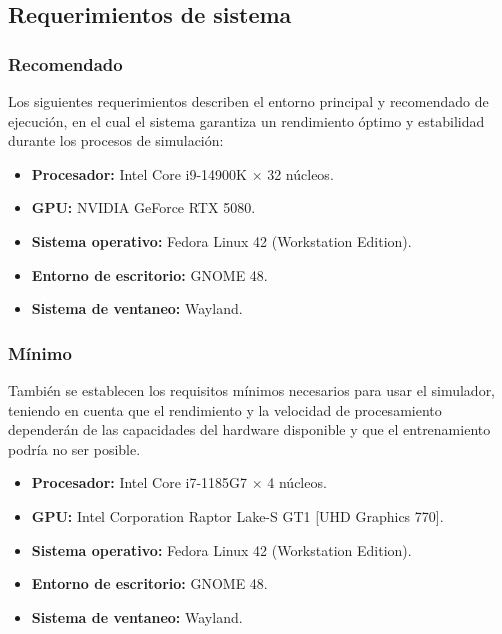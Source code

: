 \subsection{Requerimientos de sistema}

\subsubsection{Recomendado}

Los siguientes requerimientos describen el entorno principal y recomendado de ejecución, en el cual el sistema garantiza un rendimiento óptimo y estabilidad durante los procesos de simulación:

\begin{itemize}
	
	\item \textbf{Procesador:} Intel Core i9-14900K × 32 núcleos.
	
	\item \textbf{GPU:} NVIDIA GeForce RTX 5080.
	
	\item \textbf{Sistema operativo:} Fedora Linux 42 (Workstation Edition).
	
	\item \textbf{Entorno de escritorio:} GNOME 48.
	
	\item \textbf{Sistema de ventaneo:} Wayland.
	
\end{itemize}

\subsubsection{Mínimo}

También se establecen los requisitos mínimos necesarios para usar el simulador, teniendo en cuenta que el rendimiento y la velocidad de procesamiento dependerán de las capacidades del hardware disponible y que el entrenamiento podría no ser posible.

\begin{itemize}
	
	\item \textbf{Procesador:} Intel Core i7-1185G7 × 4 núcleos.
	
	\item \textbf{GPU:} Intel Corporation Raptor Lake-S GT1 [UHD Graphics 770].
	
	\item \textbf{Sistema operativo:} Fedora Linux 42 (Workstation Edition).
	
	\item \textbf{Entorno de escritorio:} GNOME 48.
	
	\item \textbf{Sistema de ventaneo:} Wayland.
	
\end{itemize}